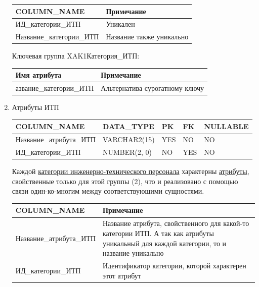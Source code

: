 \begin{enumerate}
\begin{tabular}{|p{4cm}|p{5cm}|}
        {\bf COLUMN\_NAME} & {\bf Примечание} \\ \hline
        ИД\_категории\_ИТП &  Уникален \\ \hline
        Название\_категории\_ИТП & Название также уникально \\ \hline

    \end{tabular}

    Ключевая группа XAK1Категория\_ИТП:

    \begin{tabular}{|p{4cm}|p{5cm}|} \hline

        {\bf Имя атрибута} & {\bf Примечание} \\ \hline
        азвание\_категории\_ИТП & Альтернатива сурогатному ключу \\ \hline

    \end{tabular}

    \item{Атрибуты ИТП}

    \begin{tabular}{|p{4cm}|p{3cm}|p{1cm}|p{1cm}|p{2cm}|} \hline

        {\bf COLUMN\_NAME} & {\bf DATA\_TYPE} & {\bf PK} & {\bf FK} & {\bf NULLABLE} \\ \hline
        Название\_атрибута\_ИТП & VARCHAR2(15) & YES & NO & NO \\ \hline
        ИД\_категории\_ИТП & NUMBER(2, 0) & NO & YES & NO \\ \hline

    \end{tabular}

    Каждой \underline{категории инженерно-технического персонала} характерны \underline{атрибуты}, свойственные только для этой группы (2),
    что и реализовано с помощью связи один-ко-многим между соответствующими сущностями.

    \begin{tabular}{|p{4cm}|p{5cm}|} \hline

        {\bf COLUMN\_NAME} & {\bf Примечание} \\ \hline
        Название\_атрибута\_ИТП & Название атрибута, свойственного для какой-то категории ИТП. А так как атрибуты уникальный для каждой категории, то и название уникально \\ \hline
        ИД\_категории\_ИТП & Идентификатор категории, которой характерен этот атрибут \\ \hline


\end{tabular}
\end{enumerate}
